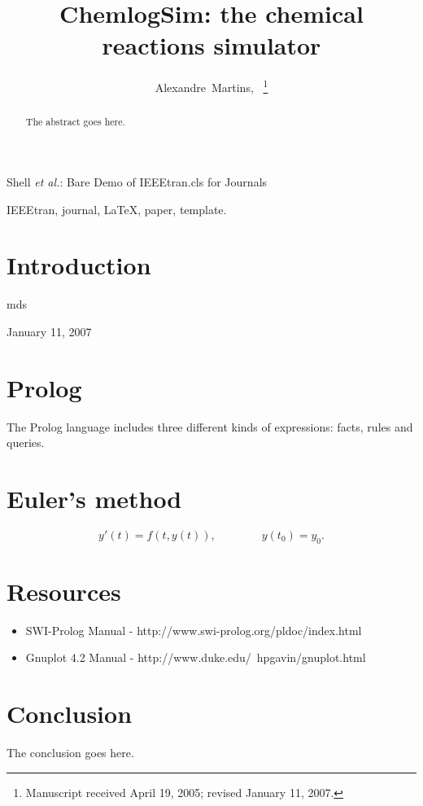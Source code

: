 \documentclass[journal]{IEEEtran}
\begin{document}
\title{ChemlogSim: the chemical reactions simulator }
\author{Alexandre~Martins,~
\thanks{Manuscript received April 19, 2005; revised January 11, 2007.}}

%
{Shell \MakeLowercase{\textit{et al.}}: Bare Demo of IEEEtran.cls for Journals}

\maketitle

\begin{abstract}
The abstract goes here.
\end{abstract}

\begin{IEEEkeywords}
IEEEtran, journal, \LaTeX, paper, template.
\end{IEEEkeywords}

\IEEEpeerreviewmaketitle

\section{Introduction}

\hfill mds
 
\hfill January 11, 2007

\section{Prolog}
The Prolog language includes three different kinds of expressions: facts, rules and queries\cite{merritt1992}.

\section{Euler's method}

\begin{equation}
y'(t) = f(t,y(t)), \qquad \qquad y(t_0)=y_0.
\end{equation}

\section{Resources}
\begin{itemize}
\item SWI-Prolog Manual - http://www.swi-prolog.org/pldoc/index.html
\item Gnuplot 4.2 Manual - http://www.duke.edu/~hpgavin/gnuplot.html
\end{itemize}

\section{Conclusion}
The conclusion goes here.


\ifCLASSOPTIONcaptionsoff
  \newpage
\fi



\end{document}
